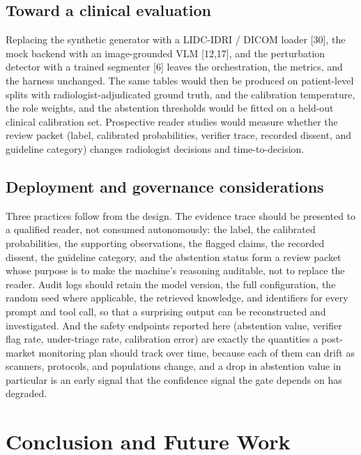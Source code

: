 \documentclass[12pt]{article}
\begin{document}
\subsection{Toward a clinical evaluation}

Replacing the synthetic generator with a LIDC-IDRI / DICOM loader [30], the mock backend with an image-grounded VLM [12,17], and the perturbation detector with a trained segmenter [6] leaves the orchestration, the metrics, and the harness unchanged. The same tables would then be produced on patient-level splits with radiologist-adjudicated ground truth, and the calibration temperature, the role weights, and the abstention thresholds would be fitted on a held-out clinical calibration set. Prospective reader studies would measure whether the review packet (label, calibrated probabilities, verifier trace, recorded dissent, and guideline category) changes radiologist decisions and time-to-decision.

\subsection{Deployment and governance considerations}

Three practices follow from the design. The evidence trace should be presented to a qualified reader, not consumed autonomously: the label, the calibrated probabilities, the supporting observations, the flagged claims, the recorded dissent, the guideline category, and the abstention status form a review packet whose purpose is to make the machine's reasoning auditable, not to replace the reader. Audit logs should retain the model version, the full configuration, the random seed where applicable, the retrieved knowledge, and identifiers for every prompt and tool call, so that a surprising output can be reconstructed and investigated. And the safety endpoints reported here (abstention value, verifier flag rate, under-triage rate, calibration error) are exactly the quantities a post-market monitoring plan should track over time, because each of them can drift as scanners, protocols, and populations change, and a drop in abstention value in particular is an early signal that the confidence signal the gate depends on has degraded.

\section{Conclusion and Future Work}\label{sec:concl}
\end{document}
